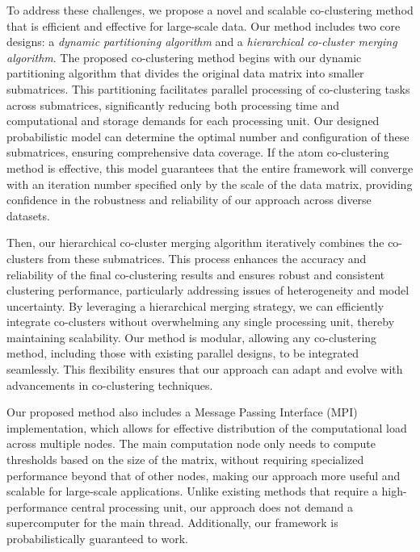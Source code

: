 \documentclass[journal]{IEEEtran}
\begin{document}
To address these challenges, we propose a novel and scalable co-clustering method that is efficient and effective for large-scale data. Our method includes two core designs: a \textit{dynamic partitioning algorithm} and a \textit{hierarchical co-cluster merging algorithm}.
The proposed co-clustering method begins with our dynamic partitioning algorithm that divides the original data matrix into smaller submatrices. This partitioning facilitates parallel processing of co-clustering tasks across submatrices, significantly reducing both processing time and computational and storage demands for each processing unit. Our designed probabilistic model can determine the optimal number and configuration of these submatrices, ensuring comprehensive data coverage. If the atom co-clustering method is effective, this model guarantees that the entire framework will converge with an iteration number specified only by the scale of the data matrix, providing confidence in the robustness and reliability of our approach across diverse datasets.

Then, our hierarchical co-cluster merging algorithm iteratively combines the co-clusters from these submatrices. This process enhances the accuracy and reliability of the final co-clustering results and ensures robust and consistent clustering performance, particularly addressing issues of heterogeneity and model uncertainty. By leveraging a hierarchical merging strategy, we can efficiently integrate co-clusters without overwhelming any single processing unit, thereby maintaining scalability. Our method is modular, allowing any co-clustering method, including those with existing parallel designs, to be integrated seamlessly. This flexibility ensures that our approach can adapt and evolve with advancements in co-clustering techniques.

Our proposed method also includes a Message Passing Interface (MPI) implementation, which allows for effective distribution of the computational load across multiple nodes. The main computation node only needs to compute thresholds based on the size of the matrix, without requiring specialized performance beyond that of other nodes, making our approach more useful and scalable for large-scale applications. Unlike existing methods that require a high-performance central processing unit, our approach does not demand a supercomputer for the main thread. Additionally, our framework is probabilistically guaranteed to work.
\end{document}
